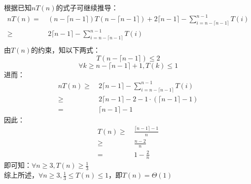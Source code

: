 \begin{solution}
    根据已知$nT(n)$的式子可继续推导：
    \begin{align*}
        nT(n) =&~ (n - \lceil n - 1 \rceil)T(n - \lceil n - 1 \rceil) + 2 \lceil n - 1 \rceil - \sum_{i = n - \lceil n - 1 \rceil}^{n - 1} T(i)\\
        \ge&~ 2 \lceil n - 1 \rceil - \sum_{i = n - \lceil n - 1 \rceil}^{n - 1} T(i)\\
    \end{align*}
    由$T(n)$的约束，知以下两式：
    $$T(n-\lceil n - 1 \rceil) \le 2$$
    $$\forall k \ge n-\lceil n - 1 \rceil+1, T(k) \le 1$$
    进而：
    \begin{align*}
        nT(n) \ge&~ 2 \lceil n - 1 \rceil - \sum_{i = n - \lceil n - 1 \rceil}^{n - 1} T(i)\\
        \ge&~ 2 \lceil n - 1 \rceil - 2 - 1 \cdot (\lceil n - 1 \rceil - 1)\\
        =&~ \lceil n - 1 \rceil - 1
    \end{align*}
    因此：
    \begin{align*}
        T(n) \ge&~ \frac{\lceil n - 1 \rceil - 1}{n}\\
        \ge&~ \frac{n - 2}{n}\\
        =&~ 1-\frac{2}{n}
    \end{align*}
    即可知：$\forall n \ge 3,T(n) \ge \frac{1}{3}$\\
    综上所述，$\forall n \ge 3, \frac{1}{3} \le T(n) \le 1$，即$T(n)=\Theta(1)$
\end{solution}